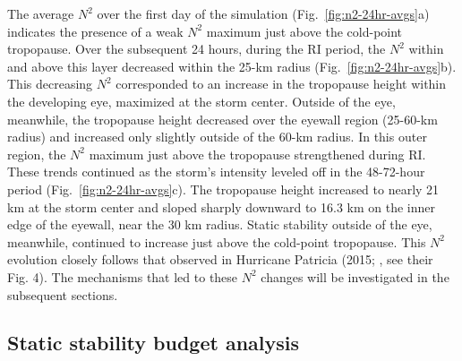 \documentclass{ametsoc}
\begin{document}
The average $N^2$ over the first day of the simulation (Fig.~\ref{fig:n2-24hr-avgs}a) indicates the presence of a weak $N^2$ maximum just above the cold-point tropopause.
Over the subsequent 24 hours, during the RI period, the $N^2$ within and above this layer decreased within the 25-km radius (Fig.~\ref{fig:n2-24hr-avgs}b).
This decreasing $N^2$ corresponded to an increase in the tropopause height within the developing eye, maximized at the storm center.
Outside of the eye, meanwhile, the tropopause height decreased over the eyewall region (25-60-km radius) and increased only slightly outside of the 60-km radius.
In this outer region, the $N^2$ maximum just above the tropopause strengthened during RI.
These trends continued as the storm's intensity leveled off in the 48-72-hour period (Fig.~\ref{fig:n2-24hr-avgs}c).
The tropopause height increased to nearly 21 km at the storm center and sloped sharply downward to 16.3 km on the inner edge of the eyewall, near the 30 km radius.
Static stability outside of the eye, meanwhile, continued to increase just above the cold-point tropopause.
This $N^2$ evolution closely follows that observed in Hurricane Patricia (2015; \citeauthor{DuranMolinari2018} \citeyear{DuranMolinari2018}, see their Fig. 4).
The mechanisms that led to these $N^2$ changes will be investigated in the subsequent sections.

 \subsection{Static stability budget analysis}
\end{document}
